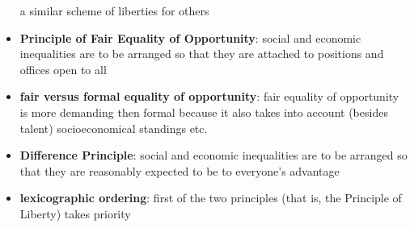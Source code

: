 \begin{itemize}
	 a similar scheme of liberties for others
	\item \textbf{Principle of Fair Equality of Opportunity}: social and
	 economic inequalities are to be arranged so that they are attached to
	 positions and offices open to all
	\item \textbf{fair versus formal equality of opportunity}: fair
	 equality of opportunity is more demanding then formal because it also
	 takes into account (besides talent) socioeconomical standings etc.
	\item \textbf{Difference Principle}: social and economic inequalities
	 are to be arranged so that they are reasonably expected to be to
	 everyone's advantage
	\item \textbf{lexicographic ordering}: first of the two principles
	 (that is, the Principle of Liberty) takes priority
\end{itemize}
